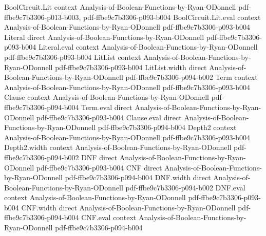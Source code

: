 \begin{theorem}
\leanok
{}
\proofstep
  {BoolCircuit.Lit}
  {context}
  {Analysis-of-Boolean-Functions-by-Ryan-ODonnell}
  {pdf-ffbe9c7b3306-p013-b003,
    pdf-ffbe9c7b3306-p093-b004}
\proofstep
  {BoolCircuit.Lit.eval}
  {context}
  {Analysis-of-Boolean-Functions-by-Ryan-ODonnell}
  {pdf-ffbe9c7b3306-p093-b004}
\proofstep
  {Literal}
  {direct}
  {Analysis-of-Boolean-Functions-by-Ryan-ODonnell}
  {pdf-ffbe9c7b3306-p093-b004}
\proofstep
  {Literal.eval}
  {context}
  {Analysis-of-Boolean-Functions-by-Ryan-ODonnell}
  {pdf-ffbe9c7b3306-p093-b004}
\proofstep
  {LitList}
  {context}
  {Analysis-of-Boolean-Functions-by-Ryan-ODonnell}
  {pdf-ffbe9c7b3306-p093-b004}
\proofstep
  {LitList.width}
  {direct}
  {Analysis-of-Boolean-Functions-by-Ryan-ODonnell}
  {pdf-ffbe9c7b3306-p094-b002}
\proofstep
  {Term}
  {context}
  {Analysis-of-Boolean-Functions-by-Ryan-ODonnell}
  {pdf-ffbe9c7b3306-p093-b004}
\proofstep
  {Clause}
  {context}
  {Analysis-of-Boolean-Functions-by-Ryan-ODonnell}
  {pdf-ffbe9c7b3306-p094-b004}
\proofstep
  {Term.eval}
  {direct}
  {Analysis-of-Boolean-Functions-by-Ryan-ODonnell}
  {pdf-ffbe9c7b3306-p093-b004}
\proofstep
  {Clause.eval}
  {direct}
  {Analysis-of-Boolean-Functions-by-Ryan-ODonnell}
  {pdf-ffbe9c7b3306-p094-b004}
\proofstep
  {Depth2}
  {context}
  {Analysis-of-Boolean-Functions-by-Ryan-ODonnell}
  {pdf-ffbe9c7b3306-p093-b004}
\proofstep
  {Depth2.width}
  {context}
  {Analysis-of-Boolean-Functions-by-Ryan-ODonnell}
  {pdf-ffbe9c7b3306-p094-b002}
\proofstep
  {DNF}
  {direct}
  {Analysis-of-Boolean-Functions-by-Ryan-ODonnell}
  {pdf-ffbe9c7b3306-p093-b004}
\proofstep
  {CNF}
  {direct}
  {Analysis-of-Boolean-Functions-by-Ryan-ODonnell}
  {pdf-ffbe9c7b3306-p094-b004}
\proofstep
  {DNF.width}
  {direct}
  {Analysis-of-Boolean-Functions-by-Ryan-ODonnell}
  {pdf-ffbe9c7b3306-p094-b002}
\proofstep
  {DNF.eval}
  {context}
  {Analysis-of-Boolean-Functions-by-Ryan-ODonnell}
  {pdf-ffbe9c7b3306-p093-b004}
\proofstep
  {CNF.width}
  {direct}
  {Analysis-of-Boolean-Functions-by-Ryan-ODonnell}
  {pdf-ffbe9c7b3306-p094-b004}
\proofstep
  {CNF.eval}
  {context}
  {Analysis-of-Boolean-Functions-by-Ryan-ODonnell}
  {pdf-ffbe9c7b3306-p094-b004}

\end{theorem}

